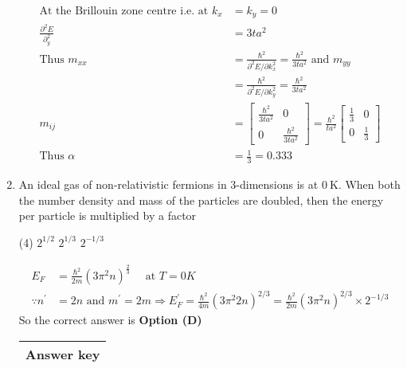 \begin{enumerate}
\begin{answer}
\begin{align*}
\text{At the Brillouin zone centre i.e. at }k_{x}&=k_{y}=0\\
\frac{\partial^{2} E}{\partial_{y}^{2}}&=3 t a^{2}\\
\text{Thus }m_{x x}&=\frac{\hbar^{2}}{\partial^{2} E / \partial k_{x}^{2}}=\frac{\hbar^{2}}{3 t a^{2}}\text{ and }m_{y y}\\&=\frac{\hbar^{2}}{\partial^{2} E / \partial k_{y}^{2}}=\frac{\hbar^{2}}{3 t a^{2}}\\
m_{i j}&=\left[\begin{array}{cc}\frac{\hbar^{2}}{3 t a^{2}} & 0 \\ 0 & \frac{\hbar^{2}}{3 t a^{2}}\end{array}\right]=\frac{\hbar^{2}}{t a^{2}}\left[\begin{array}{cc}\frac{1}{3} & 0 \\ 0 & \frac{1}{3}\end{array}\right]\\
\text{Thus }\alpha&=\frac{1}{3}=0.333
\end{align*}
\end{answer}
\item An ideal gas of non-relativistic fermions in 3-dimensions is at $0 \mathrm{~K}$. When both the number density and mass of the particles are doubled, then the energy per particle is multiplied by a factor
{}
\begin{tasks}(4)
\task[\textbf{A.}]  $2^{1 / 2}$
\task[\textbf{C.}]  $2^{1 / 3}$
\task[\textbf{D.}] $2^{-1 / 3}$
\end{tasks}
\begin{answer}
\begin{align*}
E_{F}&=\frac{\hbar^{2}}{2 m}\left(3 \pi^{2} n\right)^{\frac{2}{3}} \quad\text{ at }T=0 K\\
\because n^{\prime}&=2 n\text{ and }m^{\prime}=2 m \Rightarrow E_{F}^{\prime}=\frac{\hbar^{2}}{4 m}\left(3 \pi^{2} 2 n\right)^{2 / 3}=\frac{\hbar^{2}}{2 m}\left(3 \pi^{2} n\right)^{2 / 3} \times 2^{-1 / 3}
\end{align*}
So the correct answer is \textbf{Option (D)}
\end{answer}
\setlength\arrayrulewidth{1pt}
\begin{table}[H]
	\centering
	\begin{tabular}{|p{1.5cm}|p{1.5cm}||p{1.5cm}|p{1.5cm}|}
		\hline
		\multicolumn{4}{|c|}{\textbf{Answer key}}\\\hline\hline

\end{tabular}
\end{table}
\end{enumerate}
